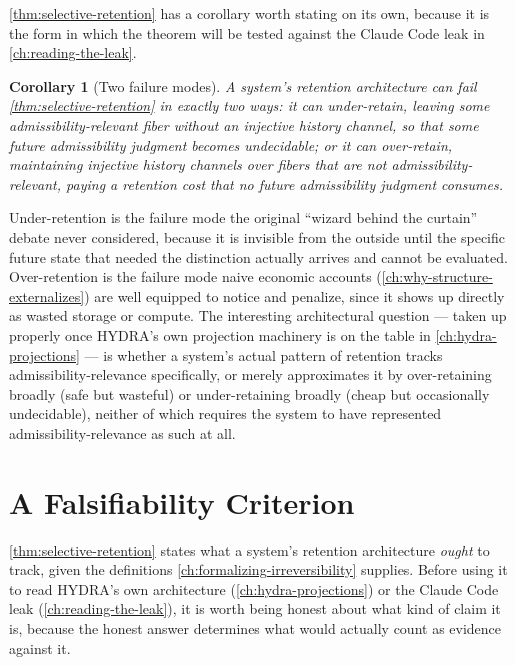 \documentclass[11pt]{book}
\theoremstyle{plain}
\newtheorem{corollary}[theorem]{Corollary}
\theoremstyle{definition}
\theoremstyle{remark}
\begin{document}
\cref{thm:selective-retention} has a corollary worth stating on its
own, because it is the form in which the theorem will be tested
against the Claude Code leak in \cref{ch:reading-the-leak}.

\begin{corollary}[Two failure modes]
\label{cor:two-failure-modes}
A system's retention architecture can fail \cref{thm:selective-retention}
in exactly two ways: it can under-retain, leaving some
admissibility-relevant fiber without an injective history channel, so
that some future admissibility judgment becomes undecidable; or it can
over-retain, maintaining injective history channels over fibers that
are not admissibility-relevant, paying a retention cost that no future
admissibility judgment consumes.
\end{corollary}

Under-retention is the failure mode the original \enquote{wizard behind
the curtain} debate never considered, because it is invisible from the
outside until the specific future state that needed the distinction
actually arrives and cannot be evaluated. Over-retention is the
failure mode naive economic accounts
(\cref{ch:why-structure-externalizes}) are well equipped to notice and
penalize, since it shows up directly as wasted storage or compute. The
interesting architectural question --- taken up properly once HYDRA's
own projection machinery is on the table in \cref{ch:hydra-projections}
--- is whether a system's actual pattern of retention tracks
admissibility-relevance specifically, or merely approximates it by
over-retaining broadly (safe but wasteful) or under-retaining broadly
(cheap but occasionally undecidable), neither of which requires the
system to have represented admissibility-relevance as such at all.
\chapter{A Falsifiability Criterion}
\label{ch:falsifiability}

\cref{thm:selective-retention} states what a system's retention
architecture \emph{ought} to track, given the definitions
\cref{ch:formalizing-irreversibility} supplies. Before using it to
read HYDRA's own architecture (\cref{ch:hydra-projections}) or the
Claude Code leak (\cref{ch:reading-the-leak}), it is worth being
honest about what kind of claim it is, because the honest answer
determines what would actually count as evidence against it.
\end{document}
